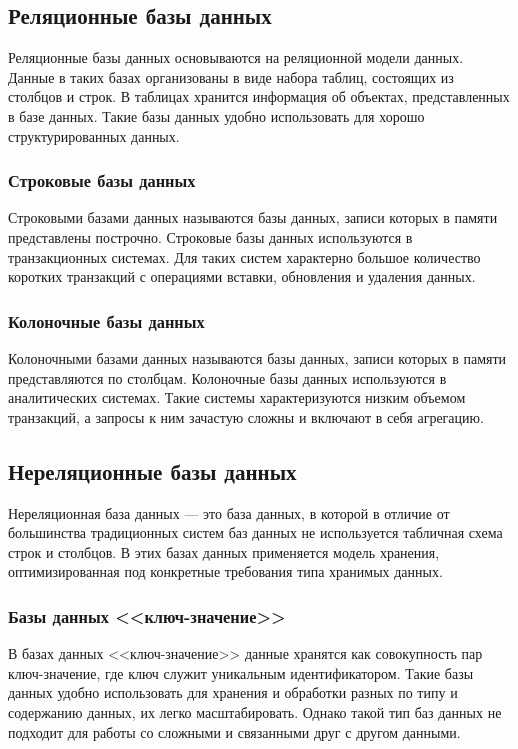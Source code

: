 \subsection{Реляционные базы данных}

Реляционные базы данных основываются на реляционной модели данных. Данные в таких базах организованы в виде набора таблиц, состоящих из столбцов и строк. В таблицах хранится информация об объектах, представленных в базе данных. Такие базы данных удобно использовать для хорошо структурированных данных.

\subsubsection{Строковые базы данных}

Строковыми базами данных называются базы данных, записи которых в памяти представлены построчно. Строковые базы данных используются в транзакционных системах. Для таких систем характерно большое количество коротких транзакций с операциями вставки, обновления и удаления данных.

\subsubsection{Колоночные базы данных}

Колоночными базами данных называются базы данных, записи которых в памяти представляются по столбцам. Колоночные базы данных используются в аналитических системах. Такие системы характеризуются низким объемом транзакций, а запросы к ним зачастую сложны и включают в себя агрегацию.

\subsection{Нереляционные базы данных}

Нереляционная база данных --- это база данных, в которой в отличие от большинства традиционных систем баз данных не используется табличная схема строк и столбцов. В этих базах данных применяется модель хранения, оптимизированная под конкретные требования типа хранимых данных.

\subsubsection{Базы данных <<ключ-значение>>}

В базах данных <<ключ-значение>> данные хранятся как совокупность пар ключ-значение, где ключ служит уникальным идентификатором. Такие базы данных удобно использовать для хранения и обработки разных по типу и содержанию данных, их легко масштабировать. Однако такой тип баз данных не подходит для работы со сложными и связанными друг с другом данными.

